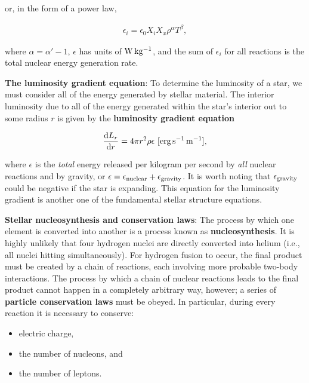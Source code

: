 \documentclass[a4paper,10pt]{article}
\begin{document}
{\noindent}or, in the form of a power law,

\begin{align*}
    \epsilon_i = \epsilon_0X_iX_x\rho^\alpha T^\beta,
\end{align*}

{\noindent}where $\alpha=\alpha'-1$, $\epsilon$ has units of ${\rm W\,kg^{-1}}$, and the sum of $\epsilon_i$ for all reactions is the total nuclear energy generation rate. 

{\noindent}\textbf{The luminosity gradient equation}: To determine the luminosity of a star, we must consider all of the energy generated by stellar material. The interior luminosity due to all of the energy generated within the star's interior out to some radius $r$ is given by the \textbf{luminosity gradient equation}

\begin{align*}
    \frac{{\rm d}L_r}{{\rm d}r} = 4\pi r^2\rho\epsilon ~ [{\rm erg\,s^{-1}\,m^{-1}}],
\end{align*}

{\noindent}where $\epsilon$ is the \textit{total} energy released per kilogram per second by \textit{all} nuclear reactions and by gravity, or $\epsilon=\epsilon_{\rm nuclear}+\epsilon_{\rm gravity}$. It is worth noting that $\epsilon_{\rm gravity}$ could be negative if the star is expanding. This equation for the luminosity gradient is another one of the fundamental stellar structure equations.

{\noindent}\textbf{Stellar nucleosynthesis and conservation laws}: The process by which one element is converted into another is a process known as \textbf{nucleosynthesis}. It is highly unlikely that four hydrogen nuclei are directly converted into helium (i.e., all nuclei hitting simultaneously). For hydrogen fusion to occur, the final product must be created by a chain of reactions, each involving more probable two-body interactions. The process by which a chain of nuclear reactions leads to the final product cannot happen in a completely arbitrary way, however; a series of \textbf{particle conservation laws} must be obeyed. In particular, during every reaction it is necessary to conserve:

\begin{itemize}
    \item electric charge,
    \item the number of nucleons, and
    \item the number of leptons.
\end{itemize}
\end{document}

